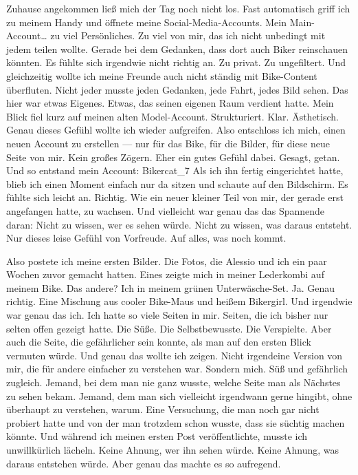 Zuhause angekommen ließ mich der Tag noch nicht los.
Fast automatisch griff ich zu meinem Handy und öffnete meine Social-Media-Accounts.
Mein Main-Account… zu viel Persönliches. Zu viel von mir, das ich nicht unbedingt mit jedem teilen wollte.
Gerade bei dem Gedanken, dass dort auch Biker reinschauen könnten.
Es fühlte sich irgendwie nicht richtig an.
Zu privat. Zu ungefiltert.
Und gleichzeitig wollte ich meine Freunde auch nicht ständig mit Bike-Content überfluten. Nicht jeder musste jeden Gedanken, jede Fahrt, jedes Bild sehen.
Das hier war etwas Eigenes.
Etwas, das seinen eigenen Raum verdient hatte.
Mein Blick fiel kurz auf meinen alten Model-Account.
Strukturiert. Klar. Ästhetisch.
Genau dieses Gefühl wollte ich wieder aufgreifen.
Also entschloss ich mich, einen neuen Account zu erstellen — nur für das Bike, für die Bilder, für diese neue Seite von mir.
Kein großes Zögern. Eher ein gutes Gefühl dabei.
Gesagt, getan.
Und so entstand mein Account:
Bikercat_7
Als ich ihn fertig eingerichtet hatte, blieb ich einen Moment einfach nur da sitzen und schaute auf den Bildschirm.
Es fühlte sich leicht an.
Richtig.
Wie ein neuer kleiner Teil von mir, der gerade erst angefangen hatte, zu wachsen.
Und vielleicht war genau das das Spannende daran:
Nicht zu wissen, wer es sehen würde.
Nicht zu wissen, was daraus entsteht.
Nur dieses leise Gefühl von Vorfreude.
Auf alles, was noch kommt. 

Also postete ich meine ersten Bilder. Die Fotos, die Alessio und ich ein paar Wochen zuvor gemacht hatten.
Eines zeigte mich in meiner Lederkombi auf meinem Bike.
Das andere?
Ich in meinem grünen Unterwäsche-Set.
Ja. Genau richtig.
Eine Mischung aus cooler Bike-Maus und heißem Bikergirl.
Und irgendwie war genau das ich.
Ich hatte so viele Seiten in mir. Seiten, die ich bisher nur selten offen gezeigt hatte.
Die Süße.
Die Selbstbewusste.
Die Verspielte.
Aber auch die Seite, die gefährlicher sein konnte, als man auf den ersten Blick vermuten würde.
Und genau das wollte ich zeigen.
Nicht irgendeine Version von mir, die für andere einfacher zu verstehen war.
Sondern mich.
Süß und gefährlich zugleich.
Jemand, bei dem man nie ganz wusste, welche Seite man als Nächstes zu sehen bekam.
Jemand, dem man sich vielleicht irgendwann gerne hingibt, ohne überhaupt zu verstehen, warum.
Eine Versuchung, die man noch gar nicht probiert hatte und von der man trotzdem schon wusste, dass sie süchtig machen könnte.
Und während ich meinen ersten Post veröffentlichte, musste ich unwillkürlich lächeln.
Keine Ahnung, wer ihn sehen würde.
Keine Ahnung, was daraus entstehen würde.
Aber genau das machte es so aufregend.



